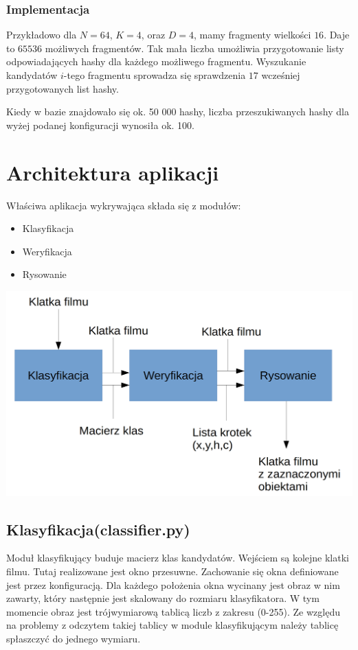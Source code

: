 \documentclass[10pt,a4paper]{article}
\begin{document}
\subsubsection{Implementacja}

Przykładowo dla $N=64$, $K=4$, oraz $D=4$, mamy fragmenty wielkości $16$. Daje to $65 536$ możliwych fragmentów. Tak mała liczba umożliwia przygotowanie listy odpowiadających hashy dla każdego możliwego fragmentu. Wyszukanie kandydatów $i$-tego fragmentu sprowadza się sprawdzenia $17$ wcześniej przygotowanych list hashy.

Kiedy w bazie znajdowało się ok. 50 000 hashy, liczba przeszukiwanych hashy dla wyżej podanej konfiguracji wynosiła ok. 100.

\section{Architektura aplikacji}

Właściwa aplikacja wykrywająca składa się z modułów:
\begin{itemize}
  \item Klasyfikacja
  \item Weryfikacja
  \item Rysowanie
\end{itemize}

\includegraphics[scale=0.3]{diagram.png}

\subsection{Klasyfikacja(classifier.py)}

Moduł klasyfikujący buduje macierz klas kandydatów. Wejściem są kolejne klatki filmu. Tutaj realizowane jest okno przesuwne. Zachowanie się okna definiowane jest przez konfiguracją. Dla każdego położenia okna wycinany jest obraz w nim zawarty, który następnie jest skalowany do rozmiaru klasyfikatora. W tym momencie obraz jest trójwymiarową tablicą liczb z zakresu (0-255). Ze względu na problemy z odczytem takiej tablicy w module klasyfikującym należy tablicę spłaszczyć do jednego wymiaru.
\end{document}
